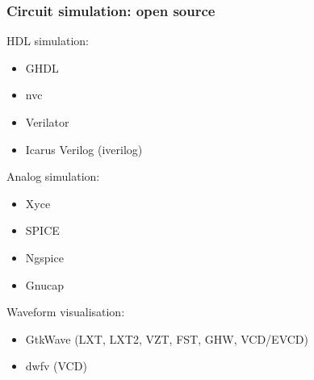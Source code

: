 \documentclass{beamer}
\begin{document}
\begin{frame}
\frametitle{Circuit simulation: open source}
\begin{minipage}[t]{.58\linewidth}
HDL simulation:
\begin{itemize}
\item GHDL
\href{https://github.com/ghdl/ghdl}{\faGithub}
\href{https://ghdl.github.io/ghdl}{\faBook}

\item nvc
\href{https://github.com/nickg/nvc}{\faGithub}

\item Verilator
\href{https://www.veripool.org/wiki/verilator}{\faGlobe}
\href{https://github.com/verilator/verilator}{\faGithub}

\item Icarus Verilog (iverilog)
\href{http://iverilog.icarus.com/}{\faGlobe}
\href{https://github.com/steveicarus/iverilog}{\faGithub}
\end{itemize}
\end{minipage}
\begin{minipage}[t]{.405\linewidth}
Analog simulation:
\begin{itemize}
\item Xyce \href{https://xyce.sandia.gov/}{\faGlobe} \href{https://github.com/Xyce/Xyce}{\faGithub}
\item SPICE \href{https://en.wikipedia.org/wiki/SPICE}{\faWikipediaW}
\item Ngspice \href{http://ngspice.sourceforge.net/}{\faGlobe}
\item Gnucap \href{http://gnucap.org}{\faGlobe}
\end{itemize}
\end{minipage}

\vfill
Waveform visualisation:
\begin{itemize}

\item GtkWave (LXT, LXT2, VZT, FST, GHW, VCD/EVCD)
\href{http://gtkwave.sourceforge.net/}{\faGlobe}
\href{https://github.com/gtkwave/gtkwave}{\faGithub}

\item dwfv (VCD)
\href{https://github.com/psurply/dwfv}{\faGithub}
\end{itemize}

\end{frame}

\end{document}
